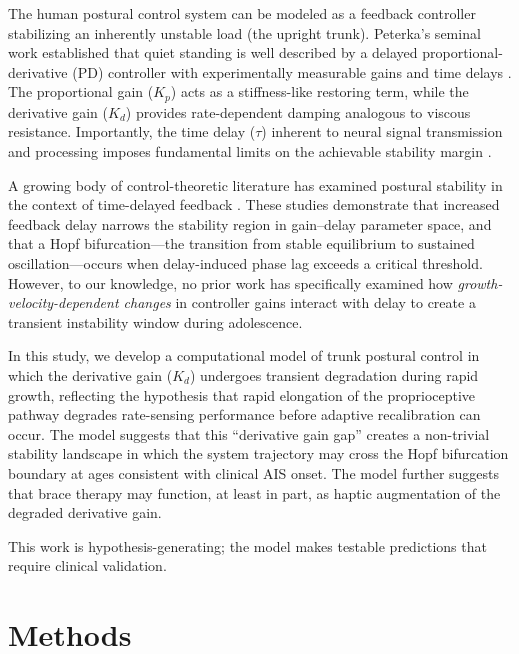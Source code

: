 \documentclass[12pt,a4paper]{article}
\begin{document}
The human postural control system can be modeled as a feedback controller stabilizing an inherently unstable load (the upright trunk). Peterka's seminal work established that quiet standing is well described by a delayed proportional-derivative (PD) controller with experimentally measurable gains and time delays \citep{peterka2002sensorimotor}. The proportional gain ($K_p$) acts as a stiffness-like restoring term, while the derivative gain ($K_d$) provides rate-dependent damping analogous to viscous resistance. Importantly, the time delay ($\tau$) inherent to neural signal transmission and processing imposes fundamental limits on the achievable stability margin \citep{stepan2009delay, insperger2011semi}.

A growing body of control-theoretic literature has examined postural stability in the context of time-delayed feedback \citep{milton2009delay, cabrera2004human, asai2009model}. These studies demonstrate that increased feedback delay narrows the stability region in gain--delay parameter space, and that a Hopf bifurcation---the transition from stable equilibrium to sustained oscillation---occurs when delay-induced phase lag exceeds a critical threshold. However, to our knowledge, no prior work has specifically examined how \textit{growth-velocity-dependent changes} in controller gains interact with delay to create a transient instability window during adolescence.

In this study, we develop a computational model of trunk postural control in which the derivative gain ($K_d$) undergoes transient degradation during rapid growth, reflecting the hypothesis that rapid elongation of the proprioceptive pathway degrades rate-sensing performance before adaptive recalibration can occur. The model suggests that this ``derivative gain gap'' creates a non-trivial stability landscape in which the system trajectory may cross the Hopf bifurcation boundary at ages consistent with clinical AIS onset. The model further suggests that brace therapy may function, at least in part, as haptic augmentation of the degraded derivative gain.

This work is hypothesis-generating; the model makes testable predictions that require clinical validation.

\section{Methods}
\end{document}
